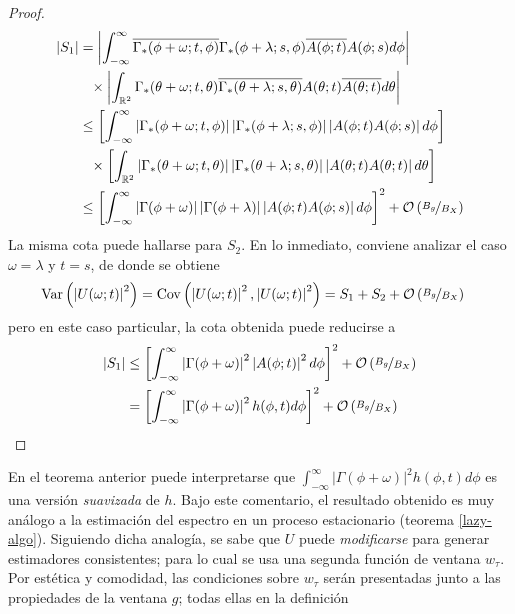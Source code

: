 \documentclass[12pt,letterpaper]{book}
\newcommand{\R}{\mathbb{R}}
\newcommand{\intR}{\int_{-\infty}^{\infty}}
\newcommand{\Var}[1]{\mathrm{Var}\left( #1 \right)}
\newcommand{\Cov}[1]{\mathrm{Cov}\left( #1 \right)}
\newcommand{\abso}[1]{\left| #1 \right|}
\newcommand{\orden}[1]{\mathcal{O}\left( #1 \right)}
\newcommand{\pheq}{\phantom{=}}
\begin{document}
\begin{proof}
\begin{align*}
\abso{S_1} &=
 \abso{ \intR \overline{\Gamma_*(\phi + \omega; t, \phi)} \Gamma_*(\phi+ \lambda; s, \phi)
 \overline{A(\phi; t)} A(\phi; s) d\phi } \\
 &\pheq \times \abso{ \int_{\R^{2}} \Gamma_*(\theta+ \omega; t, \theta) 
  \overline{\Gamma_*(\theta + \lambda; s, \theta)}  
 A(\theta; t)   \overline{A(\theta; t)} d\theta } \\ 
 &\leq
 \left[ \intR \abso{\Gamma_*(\phi + \omega; t, \phi)} \abso{\Gamma_*(\phi+ \lambda; s, \phi)}
 \abso{A(\phi; t) A(\phi; s)} d\phi \right] \\
 &\pheq \times \left[ \int_{\R^{2}} \abso{\Gamma_*(\theta+ \omega; t, \theta)} 
  \abso{\Gamma_*(\theta + \lambda; s, \theta)}  
 \abso{A(\theta; t) A(\theta; t)} d\theta \right] \\ 
 &\leq
 \left[ \intR \abso{\Gamma(\phi + \omega)} \abso{\Gamma(\phi+ \lambda)}
 \abso{A(\phi; t) A(\phi; s)} d\phi \right]^{2} + \orden{\nicefrac{B_g}{B_X}}
\end{align*}
La misma cota puede hallarse para $S_2$. En lo inmediato, conviene analizar el caso $\omega = \lambda$ y $t = s$, de donde se obtiene
\begin{align*}
\Var{\abso{U(\omega; t)}^{2}} &= \Cov{\abso{U(\omega; t)}^{2}, \abso{U(\omega; t)}^{2}} = S_1 + S_2 + \orden{\nicefrac{B_g}{B_X}}
\end{align*}
pero en este caso particular, la cota obtenida puede reducirse a
\begin{align*}
\abso{S_1} & \leq
\left[ \intR \abso{\Gamma(\phi + \omega)}^{2} \abso{A(\phi; t)}^{2} d\phi \right]^{2} + \orden{\nicefrac{B_g}{B_X}} \\
&= 
\left[ \intR \abso{\Gamma(\phi + \omega)}^{2} h(\phi, t) d\phi \right]^{2} + \orden{\nicefrac{B_g}{B_X}}
\end{align*}
\end{proof}

En el teorema anterior puede interpretarse que $\intR \abso{\Gamma(\phi + \omega)}^{2} h(\phi, t) d\phi$ es una versión \textit{suavizada} de $h$.
%
Bajo este comentario, el resultado obtenido es muy análogo a la estimación del espectro en un proceso estacionario (teorema \ref{lazy-algo}).
%
Siguiendo dicha analogía, se sabe que $U$ puede \textit{modificarse} para generar estimadores consistentes; para lo cual se usa una segunda función de ventana $w_\tau$. 
%
Por estética y comodidad, las condiciones sobre $w_\tau$ serán presentadas junto a las propiedades de la ventana $g$; todas ellas en la definición
\end{document}
